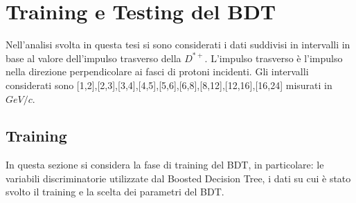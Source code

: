 \chapter{Training e Testing del BDT}

Nell'analisi svolta in questa tesi si sono considerati i dati suddivisi in intervalli in base al valore dell'impulso trasverso della $D^{*+}$. L'impulso trasverso \`e l'impulso nella direzione perpendicolare ai fasci di protoni incidenti. Gli intervalli considerati sono [1,2],[2,3],[3,4],[4,5],[5,6],[6,8],[8,12],[12,16],[16,24] misurati in $GeV/c$. 

\section{Training}

In questa sezione si considera la fase di training del BDT, in particolare: le variabili discriminatorie utilizzate dal Boosted Decision Tree, i dati su cui è stato svolto il training e la scelta dei parametri del BDT. 

